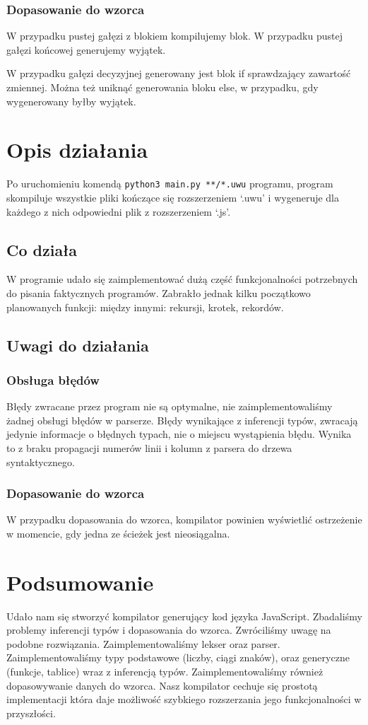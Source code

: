 \documentclass[a4paper,12pt]{book} %
\begin{document}
\subsection{Dopasowanie do wzorca}
W przypadku pustej gałęzi z blokiem kompilujemy blok.
W przypadku pustej gałęzi końcowej generujemy wyjątek.

\newpage
W przypadku gałęzi decyzyjnej generowany jest blok if sprawdzający zawartość zmiennej. Można też uniknąć generowania bloku else, w przypadku, gdy wygenerowany byłby wyjątek.


\chapter{Opis działania}
Po uruchomieniu komendą \lstinline{python3 main.py **/*.uwu} programu, program skompiluje wszystkie pliki kończące się rozszerzeniem `.uwu' i wygeneruje dla każdego z nich odpowiedni plik z rozszerzeniem `.js'.

\section{Co działa}
W programie udało się zaimplementować dużą część funkcjonalności potrzebnych do pisania faktycznych programów. Zabrakło jednak kilku początkowo planowanych funkcji: między innymi: rekursji, krotek, rekordów.
\section{Uwagi do działania}
\subsection{Obsługa błędów}
Błędy zwracane przez program nie są optymalne, nie zaimplementowaliśmy żadnej obsługi błędów w parserze. Błędy wynikające z inferencji typów, zwracają jedynie informacje o błędnych typach, nie o miejscu wystąpienia błędu. Wynika to z braku propagacji numerów linii i kolumn z parsera do drzewa syntaktycznego.
\subsection{Dopasowanie do wzorca}
W przypadku dopasowania do wzorca, kompilator powinien wyświetlić ostrzeżenie w momencie, gdy jedna ze ścieżek jest nieosiągalna.
\chapter*{Podsumowanie}
Udało nam się stworzyć kompilator generujący kod języka JavaScript. Zbadaliśmy problemy inferencji typów i dopasowania do wzorca. Zwróciliśmy uwagę na podobne rozwiązania. Zaimplementowaliśmy lekser oraz parser. Zaimplementowaliśmy typy podstawowe (liczby, ciągi znaków), oraz generyczne (funkcje, tablice) wraz z inferencją typów. Zaimplementowaliśmy również dopasowywanie danych do wzorca. Nasz kompilator cechuje się prostotą implementacji która daje możliwość szybkiego rozszerzania jego funkcjonalności w przyszłości.




\end{document}
